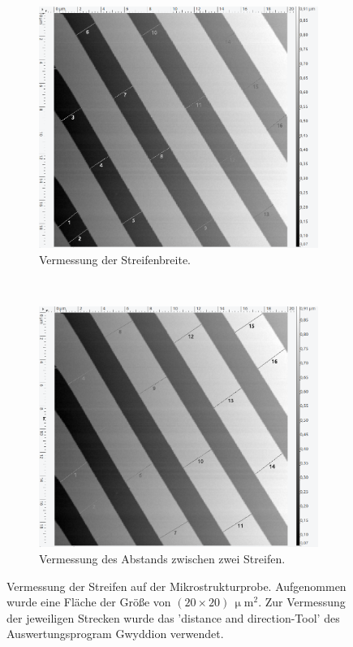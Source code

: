 %
\begin{figure}[H]
\centering
	\begin{subfigure}[t]{0.45\textwidth}
	\includegraphics[width=\textwidth]{AFM_auswertung/streif_durch_vor.png}
	\caption{Vermessung der Streifenbreite.}
	\label{abb:streifa}
	\end{subfigure}
	~
	\begin{subfigure}[t]{0.45\textwidth}
	\includegraphics[width=\textwidth]{AFM_auswertung/streif_abb_vor.png}
	\caption{Vermessung des Abstands zwischen zwei Streifen.}
	\label{abb:streifb}
	\end{subfigure}
\caption{Vermessung der Streifen auf der Mikrostrukturprobe. Aufgenommen wurde eine Fl\"ache der Gr\"o{\ss}e von $(20 \times 20) \, \upmu \text{m}^2$. Zur Vermessung der jeweiligen Strecken wurde das 'distance and direction-Tool' des Auswertungsprogram Gwyddion verwendet.}
\label{abb:streif}
\end{figure}

